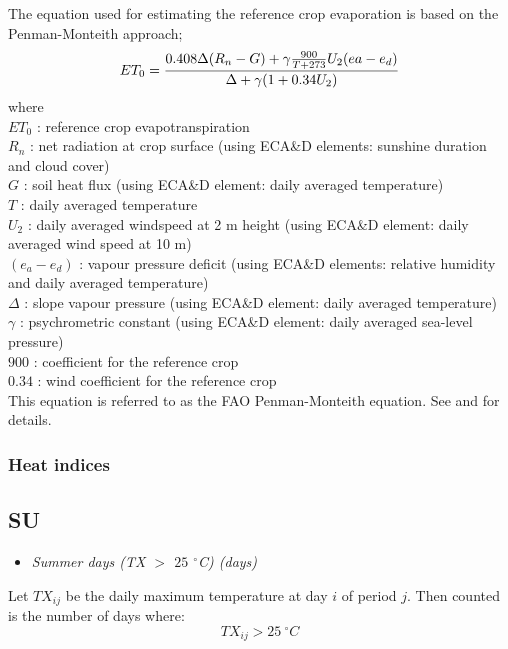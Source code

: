 \documentclass[a4paper,11pt]{article}
\begin{document}
The equation used for estimating the reference crop evaporation is based on the Penman-Monteith approach;
\begin{equation}
ET_0 = {0.408 \Delta (R_n - G) + \gamma {900 \over T + 273} U_2 ( ea - e_d) \over
\Delta + \gamma ( 1 + 0.34 U_2) } \notag
\end{equation}
where\\
$ET_0$ : reference crop evapotranspiration\\
$R_n$ : net radiation at crop surface (using ECA\&D elements: sunshine duration and cloud cover)\\
$G$ : soil heat flux (using ECA\&D element: daily averaged temperature)\\
$T$ : daily averaged temperature\\
$U_2$ : daily averaged windspeed at 2 m height (using ECA\&D element: daily averaged wind speed at 10 m)\\
$(e_a - e_d)$ : vapour pressure deficit (using ECA\&D elements: relative humidity and daily averaged temperature) \\
$\Delta$ : slope vapour pressure (using ECA\&D element: daily averaged temperature)\\
$\gamma$ : psychrometric constant (using ECA\&D element: daily averaged sea-level pressure)\\
$900$ : coefficient for the reference crop\\
$0.34$ : wind coefficient for the reference crop\\
This equation is referred to as the FAO Penman-Monteith equation. See \citet{allen:94a} and \citet{allen:94b}
for details.

\subsubsection{Heat indices}

\subsection*{SU}
\begin{itemize}
\item \textit{Summer days (TX $>$ $25$ $^\circ$C) (days)}
\end{itemize}
Let $TX_{ij}$ be the daily maximum temperature at day $i$ of period
$j$. Then counted is the number of days where:
\begin{equation*}
TX_{ij} > 25\:^\circ C
\end{equation*}
\end{document}
